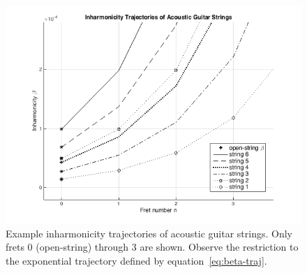\documentclass[12pt]{cmuthesis}
\begin{document}
\begin{figure}[h] 
\label{fig:beta-trajectories-ag}
\centering
\includegraphics[scale=0.70]{beta-trajectories-ag}
\caption{Example inharmonicity trajectories of acoustic guitar strings. Only frets 0 (open-string) through 3 are shown. Observe the restriction to the exponential trajectory defined by equation~\eqref{eq:beta-traj}.}
\end{figure}
\end{document}
